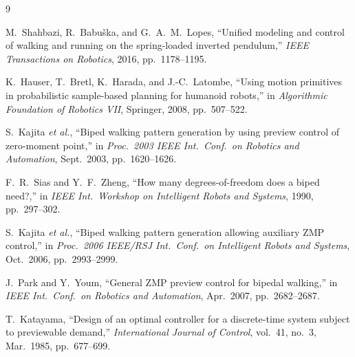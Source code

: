 \begin{thebibliography}{9}

M.~Shahbazi, R.~Babu\v{s}ka, and G.~A.~M.~Lopes,
``Unified modeling and control of walking and running on the
spring-loaded inverted pendulum,''
\emph{IEEE Transactions on Robotics}, 2016, pp.~1178--1195.

K.~Hauser, T.~Bretl, K.~Harada, and J.-C.~Latombe,
``Using motion primitives in probabilistic sample-based planning for
humanoid robots,'' in \emph{Algorithmic Foundation of Robotics VII},
Springer, 2008, pp.~507--522.

S.~Kajita \emph{et al.},
``Biped walking pattern generation by using preview control of
zero-moment point,''
in \emph{Proc.\ 2003 IEEE Int.\ Conf.\ on Robotics and Automation},
Sept.~2003, pp.~1620--1626.

F.~R.~Sias and Y.~F.~Zheng,
``How many degrees-of-freedom does a biped need?,''
in \emph{IEEE Int.\ Workshop on Intelligent Robots and Systems}, 1990,
pp.~297--302.

S.~Kajita \emph{et al.},
``Biped walking pattern generation allowing auxiliary ZMP control,''
in \emph{Proc.\ 2006 IEEE/RSJ Int.\ Conf.\ on Intelligent Robots and
Systems}, Oct.~2006, pp.~2993--2999.

J.~Park and Y.~Youm,
``General ZMP preview control for bipedal walking,''
in \emph{IEEE Int.\ Conf.\ on Robotics and Automation}, Apr.~2007,
pp.~2682--2687.

T.~Katayama,
``Design of an optimal controller for a discrete-time system subject to
previewable demand,''
\emph{International Journal of Control}, vol.~41, no.~3, Mar.~1985,
pp.~677--699.

\end{thebibliography}
